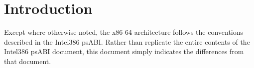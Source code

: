 
\chapter{Introduction}

Except where otherwise noted, the x86-64 architecture follows the
conventions described in the Intel386 psABI.  Rather than replicate
the entire contents of the Intel386 psABI document, this document
simply indicates the differences from that document.

